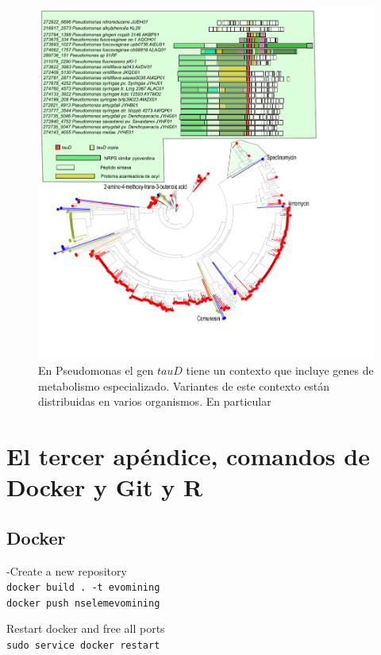 \documentclass[12pt,twoside]{reedthesis}
\begin{document}
  \begin{figure}[h!tbp]
  \centering
  \includegraphics[angle = 0,scale = .9]{chapter3/PseudomonasTauD.pdf}
  \caption[EvoMining Algorithm]{\footnotesize{En Pseudomonas el gen $tauD$ tiene un contexto que incluye genes de metabolismo especializado. Variantes de este contexto están distribuidas en varios organismos. En particular  }}
  \label{fig:PseudomonasTauD}
  \end{figure}
  
  \chapter{El tercer apéndice, comandos de Docker y Git y
  R}\label{el-tercer-apendice-comandos-de-docker-y-git-y-r}
  
  \section{Docker}\label{docker}
  
  -Create a new repository\\
  \texttt{docker\ build\ .\ -t\ evomining}\\
  \texttt{docker\ push\ nselemevomining}
  
  Restart docker and free all ports\\
  \texttt{sudo\ service\ docker\ restart}
  
\end{document}
